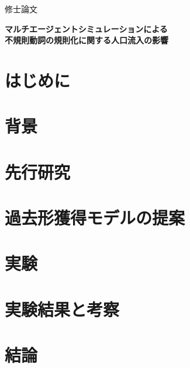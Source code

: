 \documentclass[12pt,a4j]{jarticle}
\begin{document}
\begin{center}
{\huge 修士論文}
\vspace*{4.5cm}

{\LARGE\bf マルチエージェントシミュレーションによる \\}
{\LARGE\bf 不規則動詞の規則化に関する人口流入の影響} %
\vspace*{3cm}

\thispagestyle{empty} %
\end{center}

\newpage

\tableofcontents
\thispagestyle{empty} %
\newpage

\section{はじめに}\label{sec:intro}

\newpage
\section{背景}\label{sec:back}

\newpage
\section{先行研究}\label{sec:pre}

\section{過去形獲得モデルの提案}\label{sec:model}

\section{実験}\label{sec:exp}
\section{実験結果と考察}\label{sec:kousatu}
\section{結論}\label{sec:concl}
\end{document}
